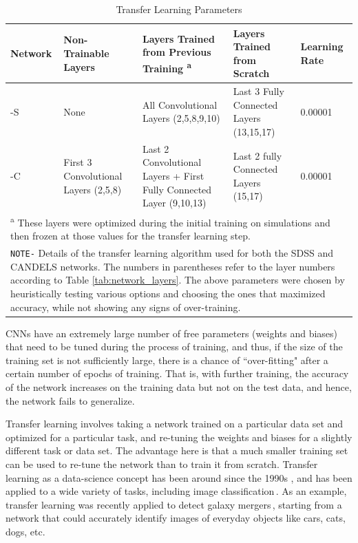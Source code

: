 \begin{table}[htbp]
  \centering
  \caption{Transfer Learning Parameters \label{tab:tl_para}}
  \begin{tabular}{p{2.5cm}p{2.5cm}p{3.25cm}p{3.25cm}p{1.25cm}}
  \hline
  \hline
  Network & Non-Trainable Layers & Layers Trained from Previous Training \textsuperscript{a} & Layers Trained from Scratch & Learning Rate \\
  \hline
  \gamornet{}-S & None & All Convolutional Layers (2,5,8,9,10) & Last 3 Fully Connected Layers (13,15,17) & 0.00001 \\
  \hline
  \gamornet{}-C & First 3 Convolutional Layers (2,5,8) & Last 2 Convolutional Layers + First Fully Connected Layer (9,10,13)& Last 2 fully Connected Layers (15,17) & 0.00001 \\
  \hline
  \multicolumn{5}{p{0.9\textwidth}}{\vskip 0.1cm \small \textsuperscript{a} These layers were optimized during the initial training on simulations and then frozen at those values for the transfer learning step.} \\
  \multicolumn{5}{p{0.9\textwidth}}{ \small \texttt{NOTE-} Details of the transfer learning algorithm used for both the SDSS and CANDELS networks. The numbers in parentheses refer to the layer numbers according to Table \ref{tab:network_layers}. The above parameters were chosen by heuristically testing various options and choosing the ones that maximized accuracy, while not showing any signs of over-training.}
  \end{tabular}
\end{table}

CNNs have an extremely large number of free parameters (weights and biases) that need to be tuned during the process of training, and thus, if the size of the training set is not sufficiently large, there is a chance of ``over-fitting" after a certain number of epochs of training. That is, with further training, the accuracy of the network increases on the training data but not on the test data, and hence, the network fails to generalize. 

Transfer learning involves taking a network trained on a particular data set and optimized for a particular task, and re-tuning the weights and biases for a slightly different task or data set. The advantage here is that a much smaller training set can be used to re-tune the network than to train it from scratch. Transfer learning as a data-science concept has been around since the 1990s \citep{Pan2010}, and has been applied to a wide variety of tasks, including image classification\,\citep{zhu2011,Kulis2011,Duan2012}. As an example, transfer learning was recently applied to detect galaxy mergers\,\citep{ml_mergers}, starting from a network that could accurately identify images of everyday objects like cars, cats, dogs, etc.

